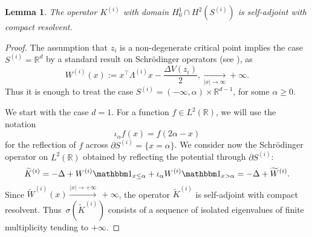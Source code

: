 \documentclass[10pt]{article}
\newcommand{\R}{\mathbb{R}}
\newcommand{\1}{\mathbbm 1}
\newtheorem{lemma}{Lemma}
\begin{document}
    \begin{lemma}
        The operator $K^{(i)}$ with domain $H_0^1\cap H^2(S^{(i)})$ is self-adjoint with compact resolvent.
    \end{lemma}
    \begin{proof}
        The assumption that $z_i$ is a non-degenerate critical point implies the case $S^{(i)}=\mathbb{R}^d$ by a standard result on Schrödinger operators (see \cite[Theorem 12. ...]{rs78}), as
        $$W^{(i)}(x) := x^\intercal \Lambda^{(i)}x -\frac{\Delta V(z_i)}2, \underset{|x|\to\infty}{\longrightarrow} +\infty.$$
        Thus it is enough to treat the case $S^{(i)} = (-\infty,\alpha)\times \R^{d-1}$, for some $\alpha \geq 0$.
        
        We start with the case $d = 1$.
        For a function $f\in L^2(\R)$, we will use the notation 
        $$\iota_\alpha f(x) = f(2\alpha- x)$$
        for the reflection of $f$ across $\partial S^{(i)} = \{x=\alpha\}$. 
        We consider now the Schrödinger operator on $L^2(\R)$ obtained by reflecting the potential through $\partial S^{(i)}$: 
        $$\widetilde K^{(i)} = -\Delta + W^{(i)}{\mathbbm 1}_{x\leq \alpha}+\iota_\alpha W^{(i)}{\mathbbm 1}_{x > \alpha} = - \Delta + \widetilde W^{(i)}.$$ 
        Since $\widetilde W^{(i)}(x) \overset{|x|\to +\infty}{\longrightarrow}\, + \infty$, the operator $\widetilde K^{(i)}$ is self-adjoint with compact resolvent.
        Thus~$\sigma(\widetilde K^{(i)})$ consists of a sequence of isolated eigenvalues of finite multiplicity tending to $+\infty$.


\end{proof}
\end{document}
